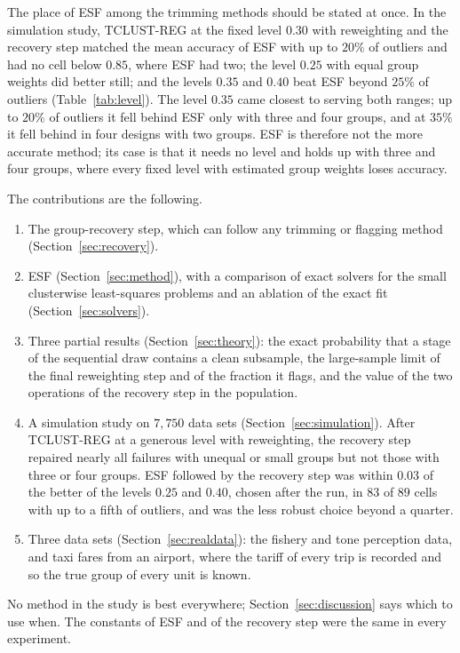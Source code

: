 The place of ESF among the trimming methods should be stated at once. In the simulation
study, TCLUST-REG at the fixed level $0.30$ with reweighting and the recovery step matched the
mean accuracy of ESF with up to $20\%$ of outliers and had no cell below $0.85$, where ESF had
two; the level $0.25$ with equal group weights did better still; and the levels $0.35$ and
$0.40$ beat ESF beyond $25\%$ of outliers (Table~\ref{tab:level}). The level $0.35$ came
closest to serving both ranges; up to $20\%$ of outliers it fell behind ESF only with three and
four groups, and at $35\%$ it fell behind in four designs with two groups. ESF is
therefore not the more accurate method; its case is that it needs no level and holds up with
three and four groups, where every fixed level with estimated group weights loses accuracy.

The contributions are the following.
\begin{enumerate}[label=(\roman*),leftmargin=2.2em,itemsep=2pt]
\item The group-recovery step, which can follow any trimming or flagging method
(Section~\ref{sec:recovery}).
\item ESF (Section~\ref{sec:method}), with a comparison of exact solvers for the small
clusterwise least-squares problems and an ablation of the exact fit (Section~\ref{sec:solvers}).
\item Three partial results (Section~\ref{sec:theory}): the exact probability that a stage of
the sequential draw contains a clean subsample, the large-sample limit of the final reweighting
step and of the fraction it flags, and the value of the two operations of the recovery step in
the population.
\item A simulation study on $7{,}750$ data sets (Section~\ref{sec:simulation}).
After TCLUST-REG at a generous level with reweighting, the recovery step repaired nearly all
failures with unequal or small groups but not those with three or four groups. ESF followed by
the recovery step was within $0.03$ of the better of the levels $0.25$ and $0.40$, chosen after
the run, in $83$ of $89$ cells with up to a fifth of outliers, and was the less robust choice
beyond a quarter.
\item Three data sets (Section~\ref{sec:realdata}): the fishery and tone perception data, and taxi
fares from an airport, where the tariff of every trip is recorded and so the true group of every
unit is known.
\end{enumerate}
No method in the study is best everywhere; Section~\ref{sec:discussion} says which to use
when. The constants of ESF and of the recovery step were the same in every experiment.
